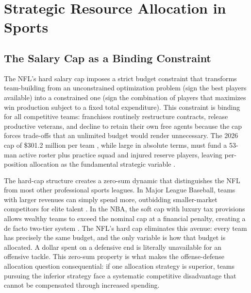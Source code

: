 \section{Strategic Resource Allocation in Sports}
\label{sec:lit-resource-allocation}

\subsection{The Salary Cap as a Binding Constraint}
\label{sec:salary-cap}

The NFL's hard salary cap imposes a strict budget constraint that transforms team-building from an unconstrained optimization problem (sign the best players available) into a constrained one (sign the combination of players that maximizes win production subject to a fixed total expenditure). This constraint is binding for all competitive teams: franchises routinely restructure contracts, release productive veterans, and decline to retain their own free agents because the cap forces trade-offs that an unlimited budget would render unnecessary. The 2026 cap of \$301.2 million per team \parencite{nfl2026cap}, while large in absolute terms, must fund a 53-man active roster plus practice squad and injured reserve players, leaving per-position allocation as the fundamental strategic variable \parencite{borghesi2008allocation}.

The hard-cap structure creates a zero-sum dynamic that distinguishes the NFL from most other professional sports leagues. In Major League Baseball, teams with larger revenues can simply spend more, outbidding smaller-market competitors for elite talent \parencite{lewis2003moneyball}. In the NBA, the soft cap with luxury tax provisions allows wealthy teams to exceed the nominal cap at a financial penalty, creating a de facto two-tier system \parencite{berri2006wages}. The NFL's hard cap eliminates this avenue: every team has precisely the same budget, and the only variable is how that budget is allocated. A dollar spent on a defensive end is literally unavailable for an offensive tackle. This zero-sum property is what makes the offense-defense allocation question consequential: if one allocation strategy is superior, teams pursuing the inferior strategy face a systematic competitive disadvantage that cannot be compensated through increased spending.

